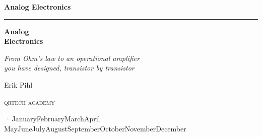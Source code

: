 %
\providecommand{\bookversion}{}
\newcommand{\bookdate}{\number\day\space\ifcase\month\or January\or February\or March\or April\or
  May\or June\or July\or August\or September\or October\or November\or December\fi\space
  \number\year}
\newcommand{\bookedition}{\ifx\bookversion\empty\else\bookversion\,·\,\fi\bookdate}

\thispagestyle{empty}
\vspace*{2.2in}
\begin{flushright}
  {\Large\bfseries Analog Electronics}
\end{flushright}
\cleardoublepage

\thispagestyle{empty}
\vspace*{1.1in}
\begin{flushleft}
  {\color{accent}\rule{0.9in}{2.5pt}}\par\vspace{1.4ex}
  {\fontsize{32}{38}\selectfont\bfseries Analog\\[0.15ex] Electronics\par}
  \vspace{2.2ex}
  {\Large\itshape From Ohm's law to an operational amplifier\\you have designed,
   transistor by transistor\par}
  \vspace{1.2in}
  {\large Erik Pihl\par}
  \vfill
  {\small\scshape\lsstyle qrtech academy\par}
  \vspace{0.6ex}
  {\small\color{muted} \bookedition\par}
\end{flushleft}
\newpage

